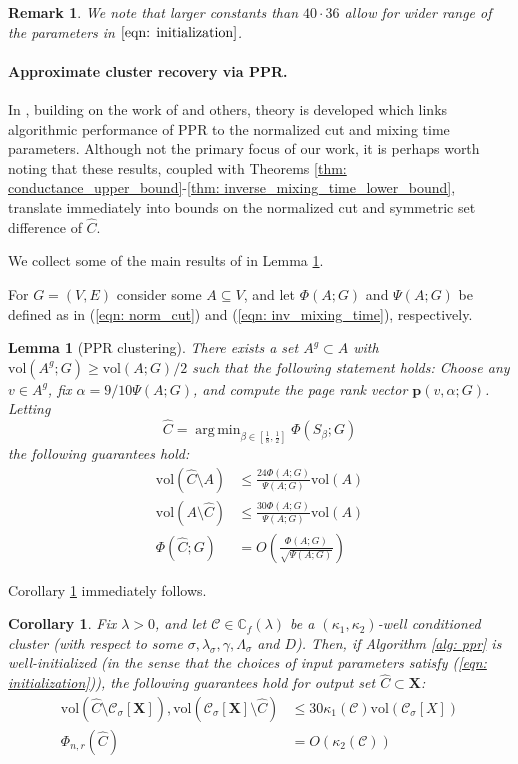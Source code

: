 \documentclass{article}
\newcommand{\vol}{\mathrm{vol}}
\newcommand{\1}{\mathbf{1}}
\newcommand{\pbf}{\mathbf{p}}
\newcommand{\Xbf}{\mathbf{X}}
\newcommand{\Cbb}{\mathbb{C}}
\newcommand{\Cset}{\mathcal{C}}
\newcommand{\Csig}{\Cset_{\sigma}}
\DeclareMathOperator*{\argmin}{arg\,min}
\theoremstyle{aldenthm}
\newtheorem{lemma}{Lemma}
\newtheorem{corollary}{Corollary}
\theoremstyle{aldenrmrk}
\newtheorem{remark}{Remark}
\begin{document}
\begin{remark}
	We note that larger constants than $40 \cdot 36$ allow for wider range of the parameters in $\eqref{eqn: initialization}$. 
\end{remark}
\paragraph{Approximate cluster recovery via PPR.}

In \cite{zhu2013}, building on the work of \cite{anderson2006} and others, theory is developed which links algorithmic performance of PPR to the normalized cut and mixing time parameters. Although not the primary focus of our work, it is perhaps worth noting that these results, coupled with Theorems \ref{thm: conductance_upper_bound}-\ref{thm: inverse_mixing_time_lower_bound}, translate immediately into bounds on the normalized cut and symmetric set difference of $\widehat{C}$.  

We collect some of the main results of \cite{zhu2013} in Lemma \ref{lem: ppr_cluster}.

For $G = (V,E)$ consider some $A \subseteq V$, and let $\Phi(A; G)$ and $\Psi(A; G)$ be defined as in (\ref{eqn: norm_cut}) and (\ref{eqn: inv_mixing_time}), respectively.
\begin{lemma}[PPR clustering]
	\label{lem: ppr_cluster}
	There exists a set $A^g \subset A$ with $\vol(A^g;G) \geq \vol(A;G)/2$ such that the following statement holds: Choose any $v \in A^g$, fix $\alpha = 9 / 10 \Psi(A; G)$, and compute the page rank vector $\pbf(v,\alpha; G)$. Letting 
	\begin{equation*}
	\widehat{C} = \argmin_{\beta \in [\frac{1}{8}, \frac{1}{2}]} \Phi(S_{\beta}; G)
	\end{equation*}
	the following guarantees hold:
	\begin{align*}
	\vol(\widehat{C} \setminus A) & \leq \frac{24 \Phi(A; G)}{\Psi(A; G)} \vol(A) \\
	\vol(A \setminus \widehat{C})  & \leq \frac{30 \Phi(A; G)}{\Psi(A; G)} \vol(A) \\
	\Phi(\widehat{C}; G) & = O\left(\frac{\Phi(A; G)}{\sqrt{\Psi(A; G)}}\right)
	\end{align*}
\end{lemma}

Corollary \ref{cor: ppr_cluster} immediately follows.
\begin{corollary}
	\label{cor: ppr_cluster}
	Fix $\lambda > 0$, and let $\Cset \in \Cbb_f(\lambda)$ be a $(\kappa_1,\kappa_2)$-well conditioned cluster (with respect to some $\sigma, \lambda_{\sigma}, \gamma, \Lambda_{\sigma}$ and $D$). Then, if Algorithm \ref{alg: ppr} is well-initialized (in the sense that the choices of input parameters satisfy (\ref{eqn: initialization})), the following guarantees hold for output set $\widehat{C} \subset \Xbf$:
	\begin{align*}
	\vol(\widehat{C} \setminus \Csig[\Xbf]), \vol(\Csig[\Xbf] \setminus \widehat{C})  & \leq 30 \kappa_1(\Cset) \vol(\Csig[X]) \\
	\Phi_{n,r}(\widehat{C}) & = O\left(\kappa_2(\Cset)\right)
	\end{align*}
\end{corollary} 
\end{document}
